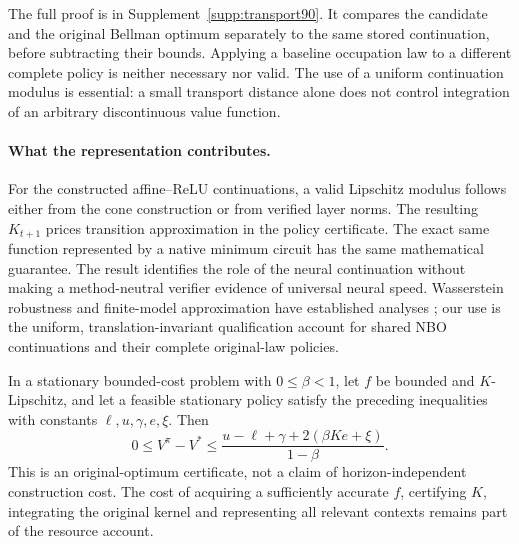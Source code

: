 The full proof is in Supplement~\ref{supp:transport90}. It compares the candidate and the original Bellman optimum separately to the same stored continuation, before subtracting their bounds. Applying a baseline occupation law to a different complete policy is neither necessary nor valid. The use of a uniform continuation modulus is essential: a small transport distance alone does not control integration of an arbitrary discontinuous value function.

\paragraph{What the representation contributes.}
For the constructed affine--ReLU continuations, a valid Lipschitz modulus follows either from the cone construction or from verified layer norms. The resulting $K_{t+1}$ prices transition approximation in the policy certificate. The exact same function represented by a native minimum circuit has the same mathematical guarantee. The result identifies the role of the neural continuation without making a method-neutral verifier evidence of universal neural speed. Wasserstein robustness and finite-model approximation have established analyses \citep{zhou2024wasserstein,saldi2015finite}; our use is the uniform, translation-invariant qualification account for shared NBO continuations and their complete original-law policies.

\begin{corollary}\label{cor:stationary90}
In a stationary bounded-cost problem with $0\le\beta<1$, let $f$ be bounded and $K$-Lipschitz, and let a feasible stationary policy satisfy the preceding inequalities with constants $\ell,u,\gamma,e,\xi$. Then
\[
 0\le V^\pi-V^*
 \le\frac{u-\ell+\gamma+2(\beta K e+\xi)}{1-\beta}.
\]
This is an original-optimum certificate, not a claim of horizon-independent construction cost. The cost of acquiring a sufficiently accurate $f$, certifying $K$, integrating the original kernel and representing all relevant contexts remains part of the resource account.
\end{corollary}


